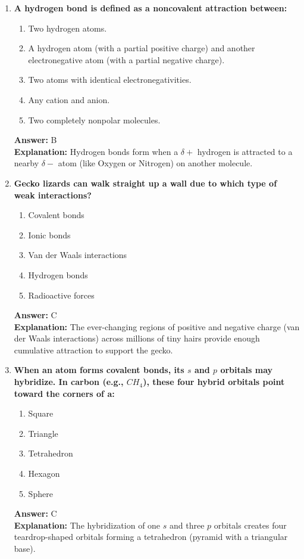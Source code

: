 \documentclass[11pt, a4paper]{article}
\begin{document}
\begin{enumerate}
\item \textbf{A hydrogen bond is defined as a noncovalent attraction between:}
\begin{enumerate}[label=\Alph*.]
    \item Two hydrogen atoms.
    \item A hydrogen atom (with a partial positive charge) and another electronegative atom (with a partial negative charge).
    \item Two atoms with identical electronegativities.
    \item Any cation and anion.
    \item Two completely nonpolar molecules.
\end{enumerate}
\textbf{Answer:} B \\
\textbf{Explanation:} Hydrogen bonds form when a $\delta+$ hydrogen is attracted to a nearby $\delta-$ atom (like Oxygen or Nitrogen) on another molecule.

\item \textbf{Gecko lizards can walk straight up a wall due to which type of weak interactions?}
\begin{enumerate}[label=\Alph*.]
    \item Covalent bonds
    \item Ionic bonds
    \item Van der Waals interactions
    \item Hydrogen bonds
    \item Radioactive forces
\end{enumerate}
\textbf{Answer:} C \\
\textbf{Explanation:} The ever-changing regions of positive and negative charge (van der Waals interactions) across millions of tiny hairs provide enough cumulative attraction to support the gecko.

\item \textbf{When an atom forms covalent bonds, its $s$ and $p$ orbitals may hybridize. In carbon (e.g., $CH_4$), these four hybrid orbitals point toward the corners of a:}
\begin{enumerate}[label=\Alph*.]
    \item Square
    \item Triangle
    \item Tetrahedron
    \item Hexagon
    \item Sphere
\end{enumerate}
\textbf{Answer:} C \\
\textbf{Explanation:} The hybridization of one $s$ and three $p$ orbitals creates four teardrop-shaped orbitals forming a tetrahedron (pyramid with a triangular base).


\end{enumerate}
\end{document}
